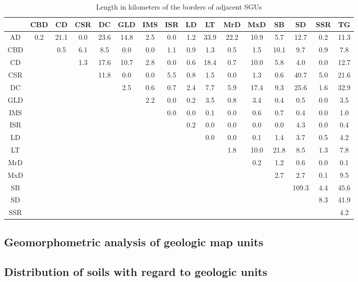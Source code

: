 \documentclass[preprint,12pt,authoryear]{elsarticle}
\begin{document}
\begin{table}[ht]
\centering
\tabcolsep=0.06cm
\small
\begin{tabular}{cccccccccccccccc}
  \hline
 & CBD & CD & CSR & DC & GLD & IMS & ISR & LD & LT & MrD & MxD & SB & SD & SSR & TG \\ 
  \hline
AD & 0.2 & 21.1 & 0.0 & 23.6 & 14.8 & 2.5 & 0.0 & 1.2 & 33.9 & 22.2 & 10.9 & 5.7 & 12.7 & 0.2 & 11.3 \\ 
  CBD &  & 0.5 & 6.1 & 8.5 & 0.0 & 0.0 & 1.1 & 0.9 & 1.3 & 0.5 & 1.5 & 10.1 & 9.7 & 0.9 & 7.8 \\ 
  CD &  &  & 1.3 & 17.6 & 10.7 & 2.8 & 0.0 & 0.6 & 18.4 & 0.7 & 10.0 & 5.8 & 4.0 & 0.0 & 12.7 \\ 
  CSR &  &  &  & 11.8 & 0.0 & 0.0 & 5.5 & 0.8 & 1.5 & 0.0 & 1.3 & 0.6 & 40.7 & 5.0 & 21.6 \\ 
  DC &  &  &  &  & 2.5 & 0.6 & 0.7 & 2.4 & 7.7 & 5.9 & 17.4 & 9.3 & 25.6 & 1.6 & 32.9 \\ 
  GLD &  &  &  &  &  & 2.2 & 0.0 & 0.2 & 3.5 & 0.8 & 3.4 & 0.4 & 0.5 & 0.0 & 3.5 \\ 
  IMS &  &  &  &  &  &  & 0.0 & 0.0 & 0.1 & 0.0 & 0.6 & 0.7 & 0.4 & 0.0 & 1.0 \\ 
  ISR &  &  &  &  &  &  &  & 0.2 & 0.0 & 0.0 & 0.0 & 0.0 & 4.3 & 0.0 & 0.4 \\ 
  LD &  &  &  &  &  &  &  &  & 0.0 & 0.0 & 0.1 & 1.4 & 3.7 & 0.5 & 4.2 \\ 
  LT &  &  &  &  &  &  &  &  &  & 1.8 & 10.0 & 21.8 & 8.5 & 1.3 & 7.8 \\ 
  MrD &  &  &  &  &  &  &  &  &  &  & 0.2 & 1.2 & 0.6 & 0.0 & 0.1 \\ 
  MxD &  &  &  &  &  &  &  &  &  &  &  & 2.7 & 2.7 & 0.1 & 9.5 \\ 
  SB &  &  &  &  &  &  &  &  &  &  &  &  & 109.3 & 4.4 & 45.6 \\ 
  SD &  &  &  &  &  &  &  &  &  &  &  &  &  & 8.3 & 41.9 \\ 
  SSR &  &  &  &  &  &  &  &  &  &  &  &  &  &  & 4.2 \\ 
   \hline
\end{tabular}
\caption{Length in kilometers of the borders of adjacent SGUs} 
\label{table:borderlength}
\end{table}

\subsection{Geomorphometric analysis of geologic map units}
\subsection{Distribution of soils with regard to geologic units}
\end{document}
